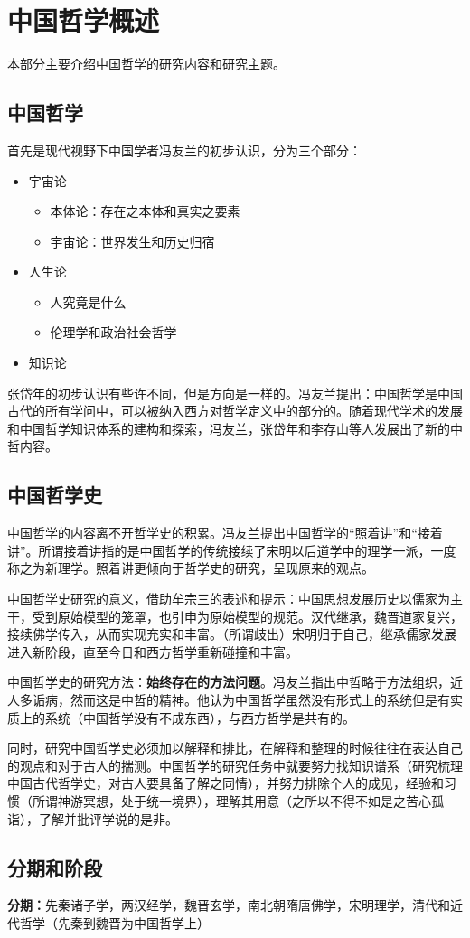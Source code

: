 \section{中国哲学概述}

本部分主要介绍中国哲学的研究内容和研究主题。

\subsection{中国哲学}

首先是现代视野下中国学者冯友兰的初步认识，分为三个部分：

\begin{itemize}
    \item 宇宙论
    \begin{itemize}
        \item 本体论：存在之本体和真实之要素
        \item 宇宙论：世界发生和历史归宿
    \end{itemize}
    \item 人生论
    \begin{itemize}
        \item 人究竟是什么
        \item 伦理学和政治社会哲学
    \end{itemize}
    \item 知识论
\end{itemize}

张岱年的初步认识有些许不同，但是方向是一样的。冯友兰提出：中国哲学是中国古代的所有学问中，可以被纳入西方对哲学定义中的部分的。随着现代学术的发展和中国哲学知识体系的建构和探索，冯友兰，张岱年和李存山等人发展出了新的中哲内容。

\subsection{中国哲学史}

中国哲学的内容离不开哲学史的积累。冯友兰提出中国哲学的“照着讲”和“接着讲”。所谓接着讲指的是中国哲学的传统接续了宋明以后道学中的理学一派，一度称之为新理学。照着讲更倾向于哲学史的研究，呈现原来的观点。

中国哲学史研究的意义，借助牟宗三的表述和提示：中国思想发展历史以儒家为主干，受到原始模型的笼罩，也引申为原始模型的规范。汉代继承，魏晋道家复兴，接续佛学传入，从而实现充实和丰富。（所谓歧出）宋明归于自己，继承儒家发展进入新阶段，直至今日和西方哲学重新碰撞和丰富。

中国哲学史的研究方法：\textbf{始终存在的方法问题}。冯友兰指出中哲略于方法组织，近人多诟病，然而这是中哲的精神。他认为中国哲学虽然没有形式上的系统但是有实质上的系统（中国哲学没有不成东西），与西方哲学是共有的。

同时，研究中国哲学史必须加以解释和排比，在解释和整理的时候往往在表达自己的观点和对于古人的揣测。中国哲学的研究任务中就要努力找知识谱系（研究梳理中国古代哲学史，对古人要具备了解之同情），并努力排除个人的成见，经验和习惯（所谓神游冥想，处于统一境界），理解其用意（之所以不得不如是之苦心孤诣），了解并批评学说的是非。

\subsection{分期和阶段}

\textbf{分期：}先秦诸子学，两汉经学，魏晋玄学，南北朝隋唐佛学，宋明理学，清代和近代哲学（先秦到魏晋为中国哲学上）

